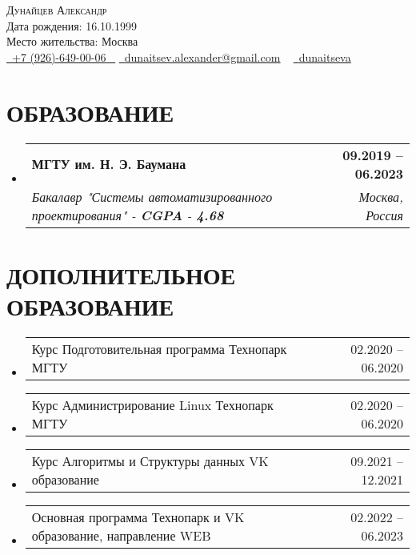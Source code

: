 \documentclass[letterpaper,11pt]{article}
\makeatletter
\newcommand{\resumeSubheading}[4]{
  \vspace{-2pt}\item
    \begin{tabular*}{1.0\textwidth}[t]{l@{\extracolsep{\fill}}r}
      \textbf{\large#1} & \textbf{\small #2} \\
      \textit{\large#3} & \textit{\small #4} \\
      
    \end{tabular*}\vspace{-7pt}
}
\newcommand{\resumeSubheadingAdditional}[2]{
	\vspace{-2pt}\item
	\begin{tabular*}{1.0\textwidth}[t]{l@{\extracolsep{\fill}}r}
		\large#1 & \small #2 \\
		
	\end{tabular*}\vspace{-7pt}
}
\newcommand{\resumeSubHeadingListStart}{\begin{itemize}[leftmargin=0.0in, label={}]}
\newcommand{\resumeSubHeadingListEnd}{\end{itemize}}
\makeatother
\begin{document}


\begin{center}
    {\Huge \scshape Дунайцев Александр} \\ \vspace{1pt}
    Дата рождения: 16.10.1999 \\  Место жительства: Москва \\ \vspace{1pt}
    \small \href{tel:+79266490006}{ \raisebox{-0.1\height}\faPhone\ \underline{+7 (926)-649-00-06} ~} \href{mailto:yourname@gmail.com}{\raisebox{-0.2\height}\faEnvelope\  \underline{dunaitsev.alexander@gmail.com}} ~ 
    \href{https://github.com/dunaitseva}{\raisebox{-0.2\height}\faGithub\ \underline{dunaitseva}} ~
    \vspace{-8pt}
\end{center}


\section{ОБРАЗОВАНИЕ}
  \resumeSubHeadingListStart
  \resumeSubheading
  {МГТУ им. Н. Э. Баумана}{09.2019 -- 06.2023}
  {Бакалавр "Системы автоматизированного проектирования" - \textbf{CGPA} - \textbf{4.68}}{Москва, Россия}
  \resumeSubHeadingListEnd

\section{ДОПОЛНИТЕЛЬНОЕ ОБРАЗОВАНИЕ}
\resumeSubHeadingListStart
\resumeSubheadingAdditional
{Курс Подготовительная программа Технопарк МГТУ}{02.2020 -- 06.2020}
\resumeSubHeadingListEnd

\resumeSubHeadingListStart
\resumeSubheadingAdditional
{Курс Администрирование Linux Технопарк МГТУ}{02.2020 -- 06.2020}
\resumeSubHeadingListEnd

\resumeSubHeadingListStart
\resumeSubheadingAdditional
{Курс Алгоритмы и Структуры данных VK образование}{09.2021 -- 12.2021}
\resumeSubHeadingListEnd

\resumeSubHeadingListStart
\resumeSubheadingAdditional
{Основная программа Технопарк и VK образование, направление WEB}{02.2022 -- 06.2023}
\resumeSubHeadingListEnd
\end{document}
